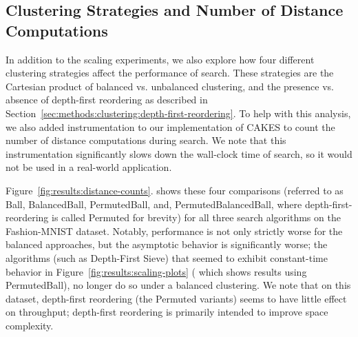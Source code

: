 \subsection{Clustering Strategies and Number of Distance Computations}
\label{sec:results:clustering-strategies-and-number-of-distance-computations}

In addition to the scaling experiments, we also explore how four different clustering strategies affect the performance of search.
These strategies are the Cartesian product of balanced vs. unbalanced clustering, and the presence vs. absence of depth-first reordering as described in Section~\ref{sec:methods:clustering:depth-first-reordering}.
To help with this analysis, we also added instrumentation to our implementation of CAKES to count the number of distance computations during search.
We note that this instrumentation significantly slows down the wall-clock time of search, so it would not be used in a real-world application.

Figure~\ref{fig:results:distance-counts}. shows these four comparisons (referred to as Ball, BalancedBall, PermutedBall, and, PermutedBalancedBall, where depth-first-reordering is called Permuted for brevity) for all three search algorithms on the Fashion-MNIST dataset.
Notably, performance is not only strictly worse for the balanced approaches, but the asymptotic behavior is significantly worse;
the algorithms (such as Depth-First Sieve) that seemed to exhibit constant-time behavior in Figure~\ref{fig:results:scaling-plots} ( which shows results using PermutedBall), no longer do so under a balanced clustering.
We note that on this dataset, depth-first reordering (the Permuted variants) seems to have little effect on throughput; depth-first reordering is primarily intended to improve space complexity.



